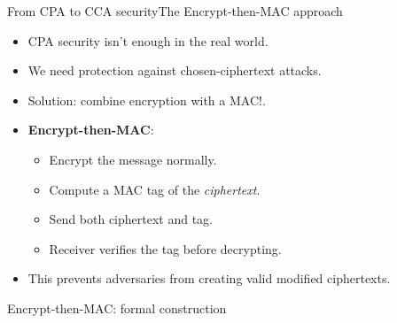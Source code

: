 \documentclass[aspectratio=169, lualatex, handout]{beamer}
\begin{document}
\begin{frame}{From CPA to CCA security}{The Encrypt-then-MAC approach}
	\begin{itemize}
		\item CPA security isn't enough in the real world.
		\item We need protection against chosen-ciphertext attacks.
		\item Solution: combine encryption with a MAC!.
		\item \textbf{Encrypt-then-MAC}:
		      \begin{itemize}
			      \item Encrypt the message normally.
			      \item Compute a MAC tag of the \textit{ciphertext}.
			      \item Send both ciphertext and tag.
			      \item Receiver verifies the tag before decrypting.
		      \end{itemize}
		\item This prevents adversaries from creating valid modified ciphertexts.
	\end{itemize}
\end{frame}

\begin{frame}{Encrypt-then-MAC: formal construction}
	\begin{columns}[c]
		\begin{column}{0.45\textwidth}
		\end{column}
		\begin{column}{0.55\textwidth}
		\end{column}
	\end{columns}
\end{frame}
\end{document}
